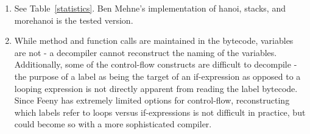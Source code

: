\documentclass[notitlepage]{report}
\begin{document}
\begin{enumerate}
	\item
			See Table~\ref{statistics}.  Ben Mehne's implementation of hanoi, stacks, and morehanoi is the tested version.
	\item
		While method and function calls are maintained in the bytecode, variables are not - a decompiler cannot reconstruct the naming of the variables.    Additionally, some of the control-flow constructs are difficult to decompile - the purpose of a label as being the target of an if-expression as opposed to a looping expression is not directly apparent from reading the label bytecode.  Since Feeny has extremely limited options for control-flow, reconstructing which labels refer to loops versus if-expressions is not difficult in practice, but could become so with a more sophisticated compiler.


\end{enumerate}
\end{document}
